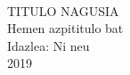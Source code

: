 \documentclass[12pt,a4paper]{article}
\begin{document}
{%
	  \centering
	   \Large
	~\vspace{\fill}

	\vspace{3.5cm} 
	{\LARGE TITULO NAGUSIA} \\
	\vspace{3.5cm}
	Hemen azpititulo bat\\
	\vspace{3.5cm}
	Idazlea: Ni neu\\
	\vspace{\fill}
	2019
}


\newpage 
\lipsum %

\tableofcontents
	\listoffigures
	\listoftables	
\end{document}
